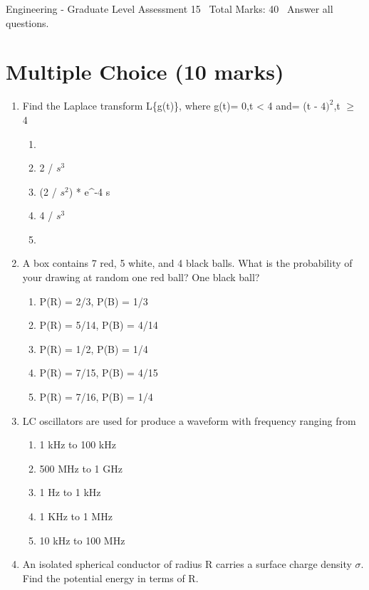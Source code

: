 \documentclass[12pt]{article}
\begin{document}
\begin{center}
Engineering - Graduate Level Assessment 15 \
Total Marks: 40 \
Answer all questions.
\end{center}

\section*{Multiple Choice (10 marks)}
\begin{enumerate}[label=\arabic*.]
\item Find the Laplace transform L\{g(t)\}, where g(t)= 0,t \textless{} 4 and= (t - $4)^2$,t \ensuremath{\geq} 4
\begin{enumerate}[label=(\alph*)]
    \item [(2 e^-4 s) / $s^3$]
    \item 2 / $s^3$
    \item (2 / $s^2$) * e^-4 s
    \item 4 / $s^3$
    \item [(2 e^-4 s) / $s^4$]
\end{enumerate}
\item A box contains 7 red, 5 white, and 4 black balls. What is the probability of your drawing at random one red ball? One black ball?
\begin{enumerate}[label=(\alph*)]
    \item P(R) = 2/3, P(B) = 1/3
    \item P(R) = 5/14, P(B) = 4/14
    \item P(R) = 1/2, P(B) = 1/4
    \item P(R) = 7/15, P(B) = 4/15
    \item P(R) = 7/16, P(B) = 1/4
\end{enumerate}
\item LC oscillators are used for produce a waveform with frequency ranging from
\begin{enumerate}[label=(\alph*)]
    \item 1 kHz to 100 kHz
    \item 500 MHz to 1 GHz
    \item 1 Hz to 1 kHz
    \item 1 KHz to 1 MHz
    \item 10 kHz to 100 MHz
\end{enumerate}
\item An isolated spherical conductor of radius R carries a surface charge density \ensuremath{\sigma}. Find the potential energy in terms of R.
\begin{enumerate}[label=(\alph*)]

\end{enumerate}
\end{enumerate}
\end{document}
